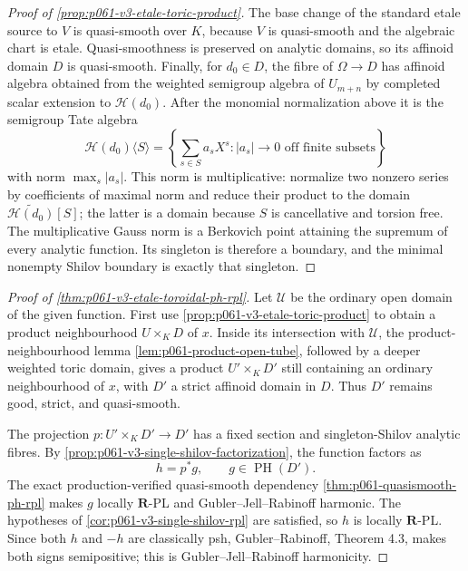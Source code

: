 \begin{proof}[Proof of \cref{prop:p061-v3-etale-toric-product}]
The base change of the standard etale source to \(V\) is quasi-smooth over
\(K\), because \(V\) is quasi-smooth and the algebraic chart is etale.
Quasi-smoothness is preserved on analytic domains, so its affinoid domain
\(D\) is quasi-smooth. Finally, for \(d_0\in D\), the fibre of
\(\Omega\to D\) has affinoid algebra obtained from the weighted semigroup
algebra of \(U_{m+n}\) by completed scalar extension to
\(\mathscr H(d_0)\). After the monomial normalization above it is the
semigroup Tate algebra
\[
 \mathscr H(d_0)\langle S\rangle
 =\left\{\sum_{s\in S}a_sX^s:
               |a_s|\longrightarrow0\text{ off finite subsets}\right\}
\]
with norm \(\max_s|a_s|\). This norm is multiplicative: normalize two
nonzero series by coefficients of maximal norm and reduce their product to
the domain \(\widetilde{\mathscr H(d_0)}[S]\); the latter is a domain because
\(S\) is cancellative and torsion free. The multiplicative Gauss norm is a
Berkovich point attaining the supremum of every analytic function. Its
singleton is therefore a boundary, and the minimal nonempty Shilov boundary
is exactly that singleton.
\end{proof}

\begin{proof}[Proof of \cref{thm:p061-v3-etale-toroidal-ph-rpl}]
Let \(\mathcal U\) be the ordinary open domain of the given function.
First use \cref{prop:p061-v3-etale-toric-product} to obtain a product
neighbourhood \(U\times_KD\) of \(x\). Inside its intersection with
\(\mathcal U\), the product-neighbourhood lemma
\cref{lem:p061-product-open-tube}, followed by a deeper weighted toric
domain, gives a product \(U'\times_KD'\) still containing an ordinary
neighbourhood of \(x\), with \(D'\) a strict affinoid domain in \(D\).
Thus \(D'\) remains good, strict, and quasi-smooth.

The projection \(p:U'\times_KD'\to D'\) has a fixed section and
singleton-Shilov analytic fibres. By
\cref{prop:p061-v3-single-shilov-factorization}, the function factors as
\[
                         h=p^*g,
 \qquad g\in\operatorname{PH}(D').
\]
The exact production-verified quasi-smooth dependency
\cref{thm:p061-quasismooth-ph-rpl} makes \(g\) locally
\(\mathbf R\)-PL and Gubler--Jell--Rabinoff harmonic. The hypotheses of
\cref{cor:p061-v3-single-shilov-rpl} are satisfied, so \(h\) is locally
\(\mathbf R\)-PL. Since both \(h\) and \(-h\) are classically psh,
Gubler--Rabinoff, Theorem 4.3, makes both signs semipositive; this is
Gubler--Jell--Rabinoff harmonicity.
\end{proof}

